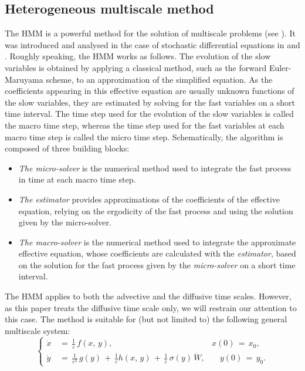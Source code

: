 \subsection{Heterogeneous multiscale method}
\label{sub:Heterogeneous multiscale method}
The HMM is a powerful method for the solution of multiscale problems (see \cite{weinan2003heterognous}).
It was introduced and analysed in the case of stochastic differential equations in \cite{vanden2003fast} and \cite{weinan2005analysis}.
Roughly speaking, the HMM works as follows.
The evolution of the slow variables is obtained by applying a classical method, such as the forward Euler-Maruyama scheme, to an approximation of the simplified equation.
As the coefficients appearing in this effective equation are usually unknown functions of the slow variables, they are estimated by solving for the fast variables on a short time interval.
The time step used for the evolution of the slow variables is called the macro time step, whereas the time step used for the fast variables at each macro time step is called the micro time step.
Schematically, the algorithm is composed of three building blocks:
\begin{itemize}
	\item \emph{The micro-solver} is the numerical method used to integrate the fast process in time at each macro time step.
	\item \emph{The estimator} provides approximations of the coefficients of the effective equation, relying on the ergodicity of the fast process and using the solution given by the micro-solver.
	\item \emph{The macro-solver} is the numerical method used to integrate the approximate effective equation, whose coefficients are calculated with the \emph{estimator}, based on the solution for the fast process given by the \emph{micro-solver} on a short time interval.
\end{itemize}
The HMM applies to both the advective and the diffusive time scales.
However, as this paper treats the diffusive time scale only, we will restrain our attention to this case.
The method is suitable for (but not limited to) the following general multiscale system:
\begin{equation*}
	\left\{\begin{aligned}
		\dot x &\,=\, \frac{1}{\varepsilon}\, f(x,\,y), \quad \quad & x(0) \,=\, x_0, \\
		\dot y &\,=\, \frac{1}{{\varepsilon}^2}\, g(y) \,+\, \frac{1}{\varepsilon} h(x,\,y)\,+\, \frac{1}{\varepsilon}\,{\sigma}(y)\, \dot W, & \quad y(0) \,=\, y_0.
	\end{aligned}\right.
\end{equation*}
